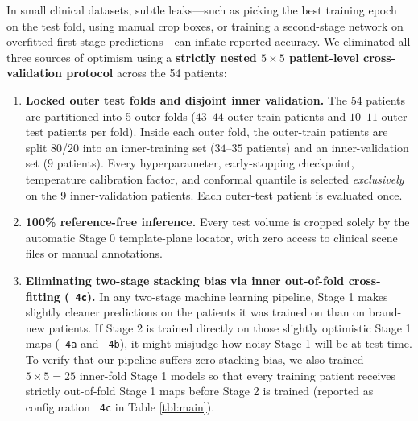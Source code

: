 \documentclass[
  11pt,
]{article}
\providecommand{\tightlist}{%
  \setlength{\itemsep}{0pt}\setlength{\parskip}{0pt}}
\let\nforigtexttt\texttt
\renewcommand{\texttt}[1]{\nforigtexttt{\XeTeXinterchartokenstate=1 #1}}
\begin{document}
In small clinical datasets, subtle leaks---such as picking the best
training epoch on the test fold, using manual crop boxes, or training a
second-stage network on overfitted first-stage predictions---can inflate
reported accuracy. We eliminated all three sources of optimism using a
\textbf{strictly nested \(5 \times 5\) patient-level cross-validation
protocol} across the 54 patients:

\begin{enumerate}
\def\labelenumi{\arabic{enumi}.}
\tightlist
\item
  \textbf{Locked outer test folds and disjoint inner validation.} The 54
  patients are partitioned into 5 outer folds (\(43\text{--}44\)
  outer-train patients and \(10\text{--}11\) outer-test patients per
  fold). Inside each outer fold, the outer-train patients are split
  80/20 into an inner-training set (\(34\text{--}35\) patients) and an
  inner-validation set (\(9\) patients). Every hyperparameter,
  early-stopping checkpoint, temperature calibration factor, and
  conformal quantile is selected \emph{exclusively} on the 9
  inner-validation patients. Each outer-test patient is evaluated once.
\item
  \textbf{100\% reference-free inference.} Every test volume is cropped
  solely by the automatic Stage 0 template-plane locator, with zero
  access to clinical scene files or manual annotations.
\item
  \textbf{Eliminating two-stage stacking bias via inner out-of-fold
  cross-fitting (\texttt{4c}).} In any two-stage machine learning
  pipeline, Stage 1 makes slightly cleaner predictions on the patients
  it was trained on than on brand-new patients. If Stage 2 is trained
  directly on those slightly optimistic Stage 1 maps (\texttt{4a} and
  \texttt{4b}), it might misjudge how noisy Stage 1 will be at test
  time. To verify that our pipeline suffers zero stacking bias, we also
  trained \(5 \times 5 = 25\) inner-fold Stage 1 models so that every
  training patient receives strictly out-of-fold Stage 1 maps before
  Stage 2 is trained (reported as configuration \texttt{4c} in Table
  \ref{tbl:main}).
\end{enumerate}
\end{document}

